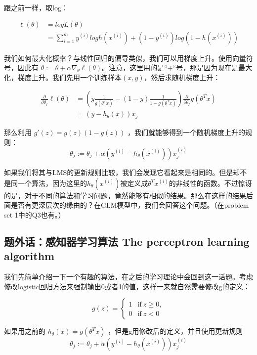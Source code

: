 \documentclass[UTF8]{ctexart}
\begin{document}
跟之前一样，取log：

\begin{align*}
\ell (\theta) & = logL(\theta)\\
& = \sum_{i=1}^{m} y^{(i)} logh(x^{(i)}) + (1-y^{(i)})log(1-h(x^{(i)})) 
\end{align*}


我们如何最大化概率？与线性回归的偏导类似，我们可以用梯度上升。使用向量符号，因此有 $\theta := \theta + \alpha \nabla_{\theta} \ell (\theta)$。注意，这里用的是“+“号，那是因为现在是最大化，梯度上升。我们先用一个训练样本$(x,y)$，然后求随机梯度上升：

\begin{align*}
\frac{\partial}{\partial \theta_{j}} \ell (\theta) & = ( y \frac{1}{g(\theta^{T}x)} - (1-y) \frac{1}{1-g(\theta^{T}x)} )  \frac{\partial}{\partial \theta_{j}}  g(\theta^{T}x) \\
& = (y-h_{\theta}(x))x_{j}
\end{align*}

那么利用 $g'(z) = g(z)(1-g(z)) $ ，我们就能够得到一个随机梯度上升的规则： \[ \theta_{j} := \theta_{j} + \alpha ( y^{(i)} - h_{\theta}(x^{(i)}))x_{j}^{(i)}  \]


如果我们将其与LMS的更新规则比较，我们会发现它看起来是相同的。但是却不是同一个算法，因为这里的$h_{\theta}(x^{(i)})$被定义成$\theta^{T}x^{(i)}$的非线性的函数。不过惊讶的是，对于不同的算法和学习问题，竟然能够有相似的结果。那么在这样的结果后面是否有更深层次的缘由的？在GLM模型中，我们会回答这个问题。（在problem set 1中的Q3也有。）


\subsection{题外话：感知器学习算法 The perceptron learning algorithm}

我们先简单介绍一下一个有趣的算法，在之后的学习理论中会回到这一话题。考虑修改logistic回归方法来强制输出0或者1的值，这样一来就自然需要修改g的定义：

\begin{equation*}
    g(z) =
	\begin{cases} 
	1 & \text{if} \ z \geq 0,\\ 
	0 & \text{if} \ z < 0
	\end{cases}
\end{equation*}

如果用之前的 $h_{\theta}(x) = g(\theta^{T}x)$ ，但是g用修改后的定义，并且使用更新规则  \[ \theta_{j} := \theta_{j} + \alpha ( y^{(i)} - h_{\theta}(x^{(i)}))x_{j}^{(i)}  \]
\end{document}
